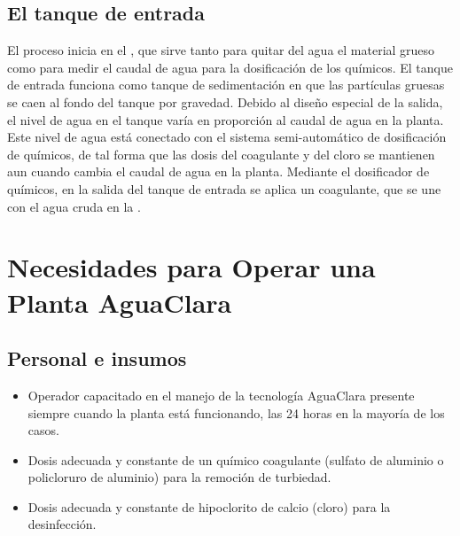 \documentclass[letterpaper,10pt,spanish]{sphinxmanual}
\begin{document}
\section{El tanque de entrada}
\label{\detokenize{Introduction/Treatment_Process:el-tanque-de-entrada}}\label{\detokenize{Introduction/Treatment_Process:heading-el-tanque-de-entrada}}
El proceso inicia en el , que sirve tanto para quitar del agua el material grueso como para medir el caudal de agua para la dosificación de los químicos. El tanque de entrada funciona como tanque de sedimentación en que las partículas gruesas se caen al fondo del tanque por gravedad. Debido al diseño especial de la salida, el nivel de agua en el tanque varía en proporción al caudal de agua en la planta. Este nivel de agua está conectado con el sistema semi-automático de dosificación de químicos, de tal forma que las dosis del coagulante y del cloro se mantienen aun cuando cambia el caudal de agua en la planta. Mediante el dosificador de químicos, en la salida del tanque de entrada se aplica un coagulante, que se une con el agua cruda en la .


\chapter{Necesidades para Operar una Planta AguaClara}
\label{\detokenize{Introduction/Requirements:necesidades-para-operar-una-planta-aguaclara}}\label{\detokenize{Introduction/Requirements:title-necesidades-para-operar-una-planta-aguaclara}}\label{\detokenize{Introduction/Requirements::doc}}

\section{Personal e insumos}
\label{\detokenize{Introduction/Requirements:personal-e-insumos}}\label{\detokenize{Introduction/Requirements:heading-personal-e-insumos}}\begin{itemize}
\item {} 
Operador capacitado en el manejo de la tecnología AguaClara presente siempre cuando la planta está funcionando, las 24 horas en la mayoría de los casos.

\item {} 
Dosis adecuada y constante de un químico coagulante (sulfato de aluminio o policloruro de aluminio) para la remoción de turbiedad.

\item {} 
Dosis adecuada y constante de hipoclorito de calcio (cloro) para la desinfección.

\end{itemize}
\end{document}
